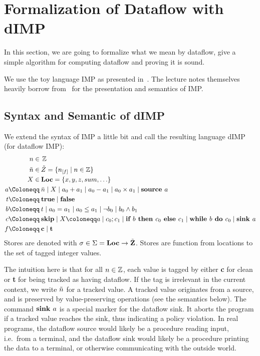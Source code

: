 \section{Formalization of Dataflow with dIMP}

In this section, we are going to formalize what we mean by dataflow,
give a simple algorithm for computing dataflow and proving it is sound.

We use the toy language IMP as presented in~\cite{sat}.
The lecture notes themselves heavily borrow from~\cite{fsopl} for the
presentation and semantics of IMP.

\subsection{Syntax and Semantic of dIMP}
We extend the syntax of IMP a little bit
and call the resulting language dIMP (for dataflow IMP):
\begin{align*}
    n \in  \:       & \Z\\
    \flaggedn{} \in \: & \StoreDomain = \{\flagged{} \mid n \in \Z\}\\
    X \in  \:       & \Loc = \{x, y, z, sum, \ldots\}\\
    a \Coloneqq \: &\literalint{} \mid X \mid a_0+a_1 \mid a_0-a_1 \mid a_0 \times a_1 \mid \defaultsource\\
    t \Coloneqq \: & \btrue \mid \bfalse                                                \\
    b \Coloneqq \: & t \mid a_0 = a_1 \mid a_0 \leq a_1 \mid \neg b_0 \mid b_0 \land b_1 \\
    c \Coloneqq \: &\skipcmd \mid \defaultstore \mid \defaultseq \mid \defaultif \mid \defaultwhile \mid \defaultsink\\
    f \Coloneqq \: & \textbf{c} \mid \textbf{t}\\
\end{align*}
Stores are denoted with $\sigma \in \Sigma = \textbf{Loc} \to \tilde{\textbf{Z}}$.
Stores are function from locations to the set of tagged integer
values.

The intuition here is that for all $n \in \operatorname{\mathbb{Z}}$, 
each value is tagged by either \textbf{c} for clean or \textbf{t} for being tracked
as having dataflow.
If the tag is irrelevant in the current context, we write $\flaggedn{}$ for a tracked
value.
A tracked value originates from a source, and is preserved by value-preserving
operations (see the semantics below).
The command $\textbf{sink }{a}$ is a special marker for the dataflow sink.
It aborts the program if a tracked value reaches the sink, thus indicating a policy 
violation.
In real programs, the dataflow source would likely be a procedure reading input,
i.e.\ from a terminal, and the dataflow sink would likely be a procedure 
printing the data to a terminal, or otherwise communicating with the outside world.


